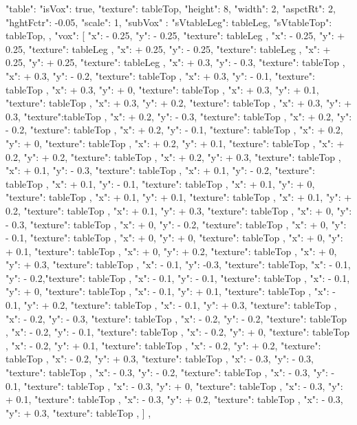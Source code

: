 {  "table": {
    "isVox": true,
    "texture": tableTop,
    "height": 8,
    "width": 2,
    "aspctRt": 2,
    "hghtFctr": -0.05,
    "scale": 1,
    "subVox" : {
      "sVtableLeg": tableLeg,
      "sVtableTop": tableTop,
    },
    "vox": [
      { "x": - 0.25, "y": - 0.25, "texture": tableLeg },
      { "x": - 0.25, "y": + 0.25, "texture": tableLeg },
      { "x": + 0.25, "y": - 0.25, "texture": tableLeg },
      { "x": + 0.25, "y": + 0.25, "texture": tableLeg },
      { "x": + 0.3, "y": - 0.3, "texture": tableTop },
      { "x": + 0.3, "y": - 0.2, "texture": tableTop },
      { "x": + 0.3, "y": - 0.1, "texture": tableTop },
      { "x": + 0.3, "y": + 0, "texture": tableTop },
      { "x": + 0.3, "y": + 0.1, "texture": tableTop },
      { "x": + 0.3, "y": + 0.2, "texture": tableTop },
      { "x": + 0.3, "y": + 0.3, "texture":tableTop },
      { "x": + 0.2, "y": - 0.3, "texture": tableTop },
      { "x": + 0.2, "y": - 0.2, "texture": tableTop },
      { "x": + 0.2, "y": - 0.1, "texture": tableTop },
      { "x": + 0.2, "y": + 0, "texture": tableTop },
      { "x": + 0.2, "y": + 0.1, "texture": tableTop },
      { "x": + 0.2, "y": + 0.2, "texture": tableTop },
      { "x": + 0.2, "y": + 0.3, "texture": tableTop },
      { "x": + 0.1, "y": - 0.3, "texture": tableTop },
      { "x": + 0.1, "y": - 0.2, "texture": tableTop },
      { "x": + 0.1, "y": - 0.1, "texture": tableTop },
      { "x": + 0.1, "y": + 0, "texture": tableTop },
      { "x": + 0.1, "y": + 0.1, "texture": tableTop },
      { "x": + 0.1, "y": + 0.2, "texture": tableTop },
      { "x": + 0.1, "y": + 0.3, "texture": tableTop },
      { "x": + 0, "y": - 0.3, "texture": tableTop },
      { "x": + 0, "y": - 0.2, "texture": tableTop },
      { "x": + 0, "y": - 0.1, "texture": tableTop },
      { "x": + 0, "y": + 0, "texture": tableTop },
      { "x": + 0, "y": + 0.1, "texture": tableTop },
      { "x": + 0, "y": + 0.2, "texture": tableTop },
      { "x": + 0, "y": + 0.3, "texture": tableTop },
      { "x": - 0.1, "y":  -0.3, "texture": tableTop},
      { "x": - 0.1, "y": - 0.2,"texture": tableTop },
      { "x": - 0.1, "y": - 0.1, "texture": tableTop },
      { "x": - 0.1, "y": + 0, "texture": tableTop },
      { "x": - 0.1, "y": + 0.1, "texture": tableTop },
      { "x": - 0.1, "y": + 0.2, "texture": tableTop },
      { "x": - 0.1, "y": + 0.3, "texture": tableTop },
      { "x": - 0.2, "y": - 0.3, "texture": tableTop },
      { "x": - 0.2, "y": - 0.2, "texture": tableTop },
      { "x": - 0.2, "y": - 0.1, "texture": tableTop },
      { "x": - 0.2, "y": + 0, "texture": tableTop },
      { "x": - 0.2, "y": + 0.1, "texture": tableTop },
      { "x": - 0.2, "y": + 0.2, "texture": tableTop },
      { "x": - 0.2, "y": + 0.3, "texture": tableTop },
      { "x": - 0.3, "y": - 0.3, "texture": tableTop },
      { "x": - 0.3, "y": - 0.2, "texture": tableTop },
      { "x": - 0.3, "y": - 0.1, "texture": tableTop },
      { "x": - 0.3, "y": + 0, "texture": tableTop },
      { "x": - 0.3, "y": + 0.1, "texture": tableTop },
      { "x": - 0.3, "y": + 0.2, "texture": tableTop },
      { "x": - 0.3, "y": + 0.3, "texture": tableTop },
    ]
  },


}
